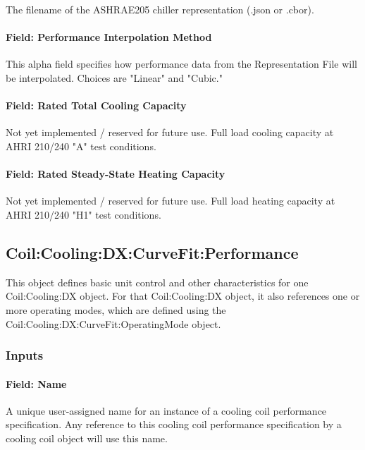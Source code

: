 The filename of the ASHRAE205 chiller representation (.json or .cbor).

\paragraph{Field: Performance Interpolation Method}

This alpha field specifies how performance data from the Representation File will be interpolated.
Choices are "Linear" and "Cubic."

\paragraph{Field: Rated Total Cooling Capacity}

Not yet implemented / reserved for future use. Full load cooling capacity at AHRI 210/240 "A" test conditions.

\paragraph{Field: Rated Steady-State Heating Capacity}

Not yet implemented / reserved for future use. Full load heating capacity at AHRI 210/240 "H1" test conditions.

\subsection{Coil:Cooling:DX:CurveFit:Performance}\label{coilcoolingdxcurvefitperformance}

This object defines basic unit control and other characteristics for one Coil:Cooling:DX object. For that Coil:Cooling:DX object, it also references one or more operating modes, which are defined using the Coil:Cooling:DX:CurveFit:OperatingMode object.

\subsubsection{Inputs}\label{inputs-02}

\paragraph{Field: Name}\label{field-name-02}

A unique user-assigned name for an instance of a cooling coil performance specification. Any reference to this cooling coil performance specification by a cooling coil object will use this name.

